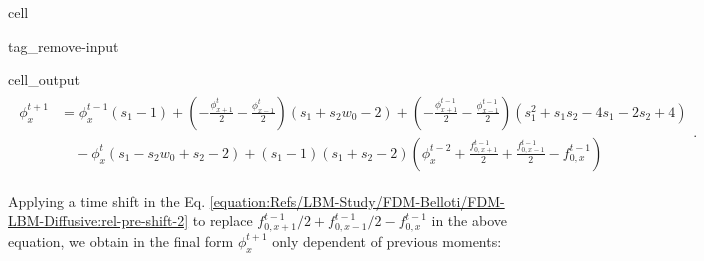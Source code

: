 \documentclass[letterpaper,10pt,english,openany,oneside]{jupyterBook}
\begin{document}
\begin{sphinxuseclass}{cell}
\begin{sphinxuseclass}{tag_remove-input}\begin{sphinxVerbatimOutput}

\begin{sphinxuseclass}{cell_output}\begin{equation*}
\begin{split}\displaystyle \begin{aligned}\phi_{x}^{t+1} &= \phi_{x}^{t-1} \left(s_{1} - 1\right) + \left(- \frac{\phi_{x+1}^t}{2} - \frac{\phi_{x-1}^t}{2}\right) \left(s_{1} + s_{2} w_{0} - 2\right) + \left(- \frac{\phi_{x+1}^{t-1}}{2} - \frac{\phi_{x-1}^{t-1}}{2}\right) \left(s_{1}^{2} + s_{1} s_{2} - 4 s_{1} - 2 s_{2} + 4\right) \\ &\quad - \phi^{t}_{x} \left(s_{1} - s_{2} w_{0} + s_{2} - 2\right) + \left(s_{1} - 1\right) \left(s_{1} + s_{2} - 2\right) \left(\phi_{x}^{t-2} + \frac{f_{0,x+1}^{t-1}}{2} + \frac{f_{0,x-1}^{t-1}}{2} - f_{0,x}^{t-1}\right)\end{aligned}.\end{split}
\end{equation*}
\end{sphinxuseclass}\end{sphinxVerbatimOutput}

\end{sphinxuseclass}
\end{sphinxuseclass}
\sphinxAtStartPar
Applying a time shift in the Eq. \eqref{equation:Refs/LBM-Study/FDM-Belloti/FDM-LBM-Diffusive:rel-pre-shift-2} to replace \(f^{t-1}_{0,x+1}/2+f^{t-1}_{0,x-1}/2-f^{t-1}_{0,x}\) in the above equation, we obtain in the final form \(\phi^{t+1}_{x}\) only dependent of previous moments:
\end{document}
